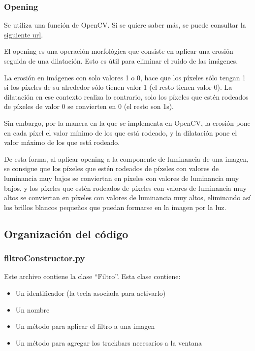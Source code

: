 \documentclass[12pt]{article}
\begin{document}
\subsubsection*{Opening}

Se utiliza una función de OpenCV. Si se quiere saber más, se puede consultar la \href{https://docs.opencv.org/4.x/d9/d61/tutorial_py_morphological_ops.html#gsc.tab=0}{siguiente url}.

El opening es una operación morfológica que consiste en aplicar una erosión seguida de una dilatación. Esto es útil para eliminar el ruido de las imágenes.

La erosión en imágenes con solo valores 1 o 0, hace que los píxeles sólo tengan 1 si los píxeles de su alrededor sólo tienen valor 1 (el resto tienen valor 0). La dilatación en ese contexto realiza lo contrario, solo los píxeles que estén rodeados de píxeles de valor 0 se convierten en 0 (el resto son 1s).

Sin embargo, por la manera en la que se implementa en OpenCV, la erosión pone en cada píxel el valor mínimo de los que está rodeado, y la dilatación pone el valor máximo de los que está rodeado.

De esta forma, al aplicar opening a la componente de luminancia de una imagen, se consigue que los píxeles que estén rodeados de píxeles con valores de luminancia muy bajos se conviertan en píxeles con valores de luminancia muy bajos, y los píxeles que estén rodeados de píxeles con valores de luminancia muy altos se conviertan en píxeles con valores de luminancia muy altos, eliminando así los brillos blancos pequeños que puedan formarse en la imagen por la luz.

\subsection*{Organización del código}

\subsubsection*{filtroConstructor.py}
Este archivo contiene la clase ``Filtro''.  Esta clase contiene:
\begin{itemize}
    \item Un identificador (la tecla asociada para activarlo)
    \item Un nombre
    \item Un método para aplicar el filtro a una imagen
    \item Un método para agregar los trackbars necesarios a la ventana
\end{itemize}
\end{document}
